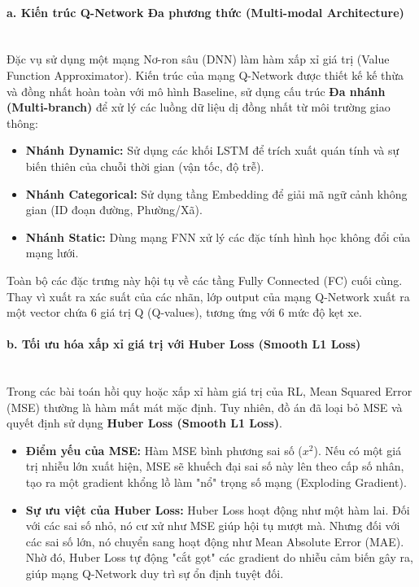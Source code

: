 \paragraph{a. Kiến trúc Q-Network Đa phương thức (Multi-modal Architecture)} \mbox{} \\
Đặc vụ sử dụng một mạng Nơ-ron sâu (DNN) làm hàm xấp xỉ giá trị (Value Function Approximator). Kiến trúc của mạng Q-Network được thiết kế kế thừa và đồng nhất hoàn toàn với mô hình Baseline, sử dụng cấu trúc \textbf{Đa nhánh (Multi-branch)} để xử lý các luồng dữ liệu dị đồng nhất từ môi trường giao thông:
\begin{itemize}
    \item \textbf{Nhánh Dynamic:} Sử dụng các khối LSTM để trích xuất quán tính và sự biến thiên của chuỗi thời gian (vận tốc, độ trễ).
    \item \textbf{Nhánh Categorical:} Sử dụng tầng Embedding để giải mã ngữ cảnh không gian (ID đoạn đường, Phường/Xã).
    \item \textbf{Nhánh Static:} Dùng mạng FNN xử lý các đặc tính hình học không đổi của mạng lưới.
\end{itemize}
Toàn bộ các đặc trưng này hội tụ về các tầng Fully Connected (FC) cuối cùng. Thay vì xuất ra xác suất của các nhãn, lớp output của mạng Q-Network xuất ra một vector chứa $6$ giá trị Q (Q-values), tương ứng với $6$ mức độ kẹt xe.

\paragraph{b. Tối ưu hóa xấp xỉ giá trị với Huber Loss (Smooth L1 Loss)} \mbox{} \\
Trong các bài toán hồi quy hoặc xấp xỉ hàm giá trị của RL, Mean Squared Error (MSE) thường là hàm mất mát mặc định. Tuy nhiên, đồ án đã loại bỏ MSE và quyết định sử dụng \textbf{Huber Loss (Smooth L1 Loss)}.
\begin{itemize}
    \item \textbf{Điểm yếu của MSE:} Hàm MSE bình phương sai số ($x^2$). Nếu có một giá trị nhiễu lớn xuất hiện, MSE sẽ khuếch đại sai số này lên theo cấp số nhân, tạo ra một gradient khổng lồ làm "nổ" trọng số mạng (Exploding Gradient).
    \item \textbf{Sự ưu việt của Huber Loss:} Huber Loss hoạt động như một hàm lai. Đối với các sai số nhỏ, nó cư xử như MSE giúp hội tụ mượt mà. Nhưng đối với các sai số lớn, nó chuyển sang hoạt động như Mean Absolute Error (MAE). Nhờ đó, Huber Loss tự động "cắt gọt" các gradient do nhiễu cảm biến gây ra, giúp mạng Q-Network duy trì sự ổn định tuyệt đối.
\end{itemize}

